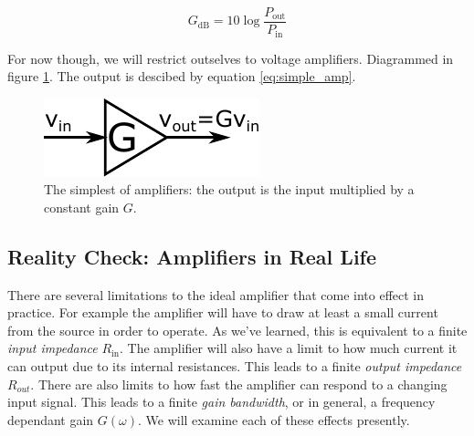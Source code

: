 \documentclass[]{article}
\begin{document}
\begin{equation}
\label{eq:power_amp_dB}
G_\text{dB} = 10\log\frac{P_\text{out}}{P_\text{in}} 
\end{equation}

\noindent For now though, we will restrict outselves to voltage amplifiers. Diagrammed in figure \ref{fig:simple_amp}. The output is descibed by equation \ref{eq:simple_amp}.

\begin{figure}[h]
\caption{The simplest of amplifiers: the output is the input multiplied by a constant gain $G$.}
\label{fig:simple_amp}
\begin{center}
\includegraphics{Images/SimpleAmplifier.pdf}
\end{center}
\end{figure}

\subsection{Reality Check: Amplifiers in Real Life}
There are several limitations to the ideal amplifier that come into effect in practice. For example the amplifier will have to draw at least a small current from the source in order to operate. As we've learned, this is equivalent to a finite \textit{input impedance} $R_\text{in}$. The amplifier will also have a limit to how much current it can output due to its internal resistances. This leads to a finite \textit{output impedance} $R_{out}$. There are also limits to how fast the amplifier can respond to a changing input signal. This leads to a finite \textit{gain bandwidth}, or in general, a frequency dependant gain $G(\omega)$. We will examine each of these effects presently.
\end{document}
